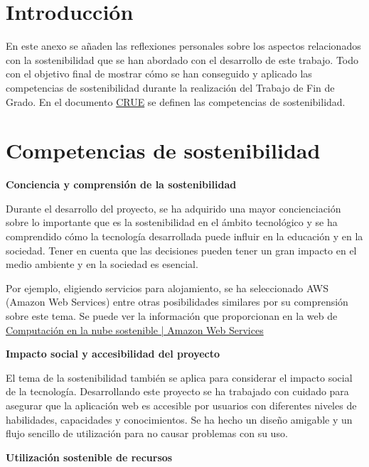 
\section{Introducción}

En este anexo se añaden las reflexiones personales sobre los aspectos relacionados con la sostenibilidad que se han abordado con el desarrollo de este trabajo. Todo con el objetivo final de mostrar cómo se han conseguido y aplicado las competencias de sostenibilidad durante la realización del Trabajo de Fin de Grado. En el documento \href{https://www.crue.org/wp-content/uploads/2020/02/Directrices_Sosteniblidad_Crue2012.pdf}{CRUE} se definen las competencias de sostenibilidad.

\section{Competencias de sostenibilidad}

\textbf{Conciencia y comprensión de la sostenibilidad}

Durante el desarrollo del proyecto, se ha adquirido una mayor concienciación sobre lo importante que es la sostenibilidad en el ámbito tecnológico y se ha comprendido cómo la tecnología desarrollada puede influir en la educación y en la sociedad. Tener en cuenta que las decisiones pueden tener un gran impacto en el medio ambiente y en la sociedad es esencial.

Por ejemplo, eligiendo servicios para alojamiento, se ha seleccionado AWS (Amazon Web Services) entre otras posibilidades similares por su comprensión sobre este tema. Se puede ver la información que proporcionan en la web de \href{https://aws.amazon.com/es/sustainability/}{Computación en la nube sostenible | Amazon Web Services}

\newpage

\textbf{Impacto social y accesibilidad del proyecto}

El tema de la sostenibilidad también se aplica para considerar el impacto social de la tecnología. Desarrollando este proyecto se ha trabajado con cuidado para asegurar que la aplicación web es accesible por usuarios con diferentes niveles de habilidades, capacidades y conocimientos. Se ha hecho un diseño amigable y un flujo sencillo de utilización para no causar problemas con su uso.

\textbf{Utilización sostenible de recursos}

